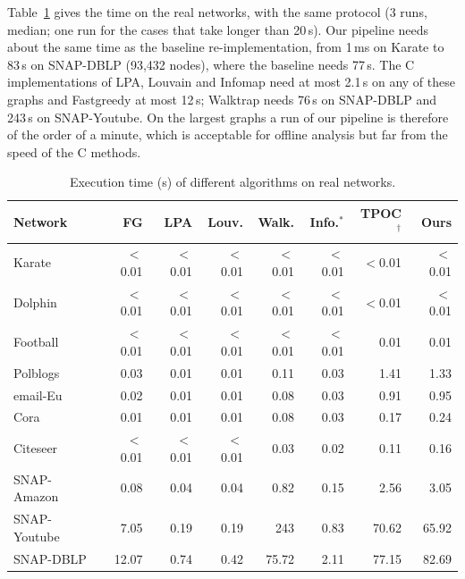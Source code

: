 \documentclass[conference]{IEEEtran}
\begin{document}
Table~\ref{tab:latreal} gives the time on the real networks, with the same protocol (3 runs, median; one run for the cases that take longer than 20\,s). Our pipeline needs about the same time as the baseline re-implementation, from 1\,ms on Karate to 83\,s on SNAP-DBLP (93,432 nodes), where the baseline needs 77\,s. The C implementations of LPA, Louvain and Infomap need at most 2.1\,s on any of these graphs and Fastgreedy at most 12\,s; Walktrap needs 76\,s on SNAP-DBLP and 243\,s on SNAP-Youtube. On the largest graphs a run of our pipeline is therefore of the order of a minute, which is acceptable for offline analysis but far from the speed of the C methods.

\begin{table}[t]
\centering
\caption{Execution time (s) of different algorithms on real networks.}
\label{tab:latreal}
\scriptsize\setlength{\tabcolsep}{2.2pt}
\begin{tabular}{lrrrrrrr}
\toprule
Network & FG & LPA & Louv. & Walk. & Info.$^{*}$ & TPOC$^{\dagger}$ & Ours \\
\midrule
Karate & $<$0.01 & $<$0.01 & $<$0.01 & $<$0.01 & $<$0.01 & $<$0.01 & $<$0.01 \\
Dolphin & $<$0.01 & $<$0.01 & $<$0.01 & $<$0.01 & $<$0.01 & $<$0.01 & $<$0.01 \\
Football & $<$0.01 & $<$0.01 & $<$0.01 & $<$0.01 & $<$0.01 & 0.01 & 0.01 \\
Polblogs & 0.03 & 0.01 & 0.01 & 0.11 & 0.03 & 1.41 & 1.33 \\
email-Eu & 0.02 & 0.01 & 0.01 & 0.08 & 0.03 & 0.91 & 0.95 \\
Cora & 0.01 & 0.01 & 0.01 & 0.08 & 0.03 & 0.17 & 0.24 \\
Citeseer & $<$0.01 & $<$0.01 & $<$0.01 & 0.03 & 0.02 & 0.11 & 0.16 \\
SNAP-Amazon & 0.08 & 0.04 & 0.04 & 0.82 & 0.15 & 2.56 & 3.05 \\
SNAP-Youtube & 7.05 & 0.19 & 0.19 & 243 & 0.83 & 70.62 & 65.92 \\
SNAP-DBLP & 12.07 & 0.74 & 0.42 & 75.72 & 2.11 & 77.15 & 82.69 \\
\bottomrule
\end{tabular}
\end{table}
\end{document}

